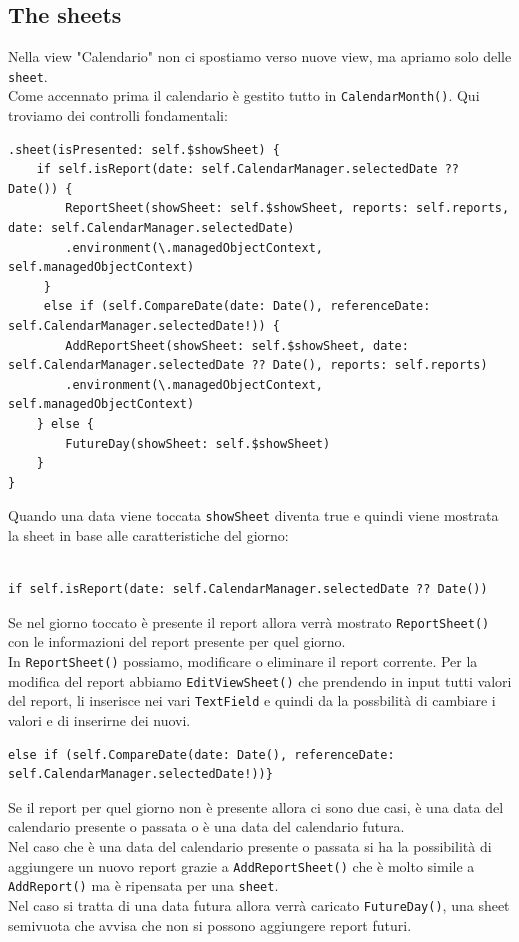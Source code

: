 \documentclass{article}
\begin{document}
\subsection{The sheets}

Nella view "Calendario" non ci spostiamo verso nuove view, ma apriamo solo delle \texttt{sheet}. \\
Come accennato prima il calendario è gestito tutto in \texttt{CalendarMonth()}. Qui troviamo dei controlli fondamentali: 

\begin{lstlisting}
.sheet(isPresented: self.$showSheet) {
	if self.isReport(date: self.CalendarManager.selectedDate ?? Date()) {
		ReportSheet(showSheet: self.$showSheet, reports: self.reports, date: self.CalendarManager.selectedDate)
		.environment(\.managedObjectContext, self.managedObjectContext)
	 }
	 else if (self.CompareDate(date: Date(), referenceDate: self.CalendarManager.selectedDate!)) {
		AddReportSheet(showSheet: self.$showSheet, date: self.CalendarManager.selectedDate ?? Date(), reports: self.reports)
		.environment(\.managedObjectContext, self.managedObjectContext)
	} else {
		FutureDay(showSheet: self.$showSheet)
	}
}
\end{lstlisting}

Quando una data viene toccata \texttt{showSheet} diventa true e quindi viene mostrata la sheet in base alle caratteristiche del giorno:\\
\\
\begin{lstlisting}
if self.isReport(date: self.CalendarManager.selectedDate ?? Date())
\end{lstlisting}
Se nel giorno toccato è presente il report allora verrà mostrato \texttt{ReportSheet()} con le informazioni del report presente per quel giorno.\\
In \texttt{ReportSheet()} possiamo, modificare o eliminare il report corrente. Per la modifica del report abbiamo \texttt{EditViewSheet()} che prendendo in input tutti valori del report, li inserisce nei vari \texttt{TextField} e quindi da la possbilità di cambiare i valori e di inserirne dei nuovi.
\\
\begin{lstlisting}
else if (self.CompareDate(date: Date(), referenceDate: self.CalendarManager.selectedDate!))}
\end{lstlisting}
Se il report per quel giorno non è presente allora ci sono due casi, è una data del calendario presente o passata o è una data del calendario futura.\\
Nel caso che è una data del calendario presente o passata si ha la possibilità di aggiungere un nuovo report grazie a \texttt{AddReportSheet()} che è molto simile a \texttt{AddReport()} ma è ripensata per una \texttt{sheet}.\\
Nel caso si tratta di una data futura allora verrà caricato \texttt{FutureDay()}, una sheet semivuota che avvisa che non si possono aggiungere report futuri. 
\end{document}
